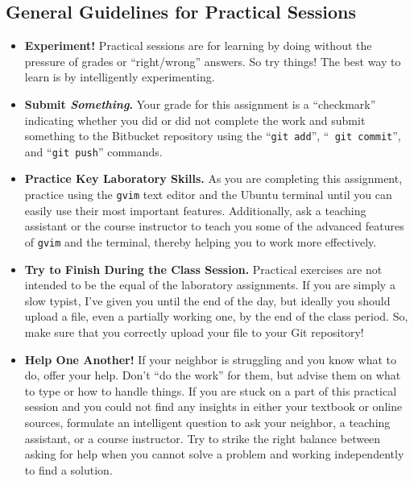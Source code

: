\vspace*{-.2in}
\subsection*{General Guidelines for Practical Sessions}


\vspace*{-.05in}
\begin{itemize}

\itemsep 0in

\item {\bf Experiment!} Practical sessions are for learning by doing without the pressure of grades or ``right/wrong''
  answers. So try things!  The best way to learn is by intelligently experimenting.

\item {\bf Submit \textbf{\textit{Something}}.} Your grade for this assignment is a ``checkmark'' indicating whether you
  did or did not complete the work and submit something to the Bitbucket repository using the ``{\tt git add}'', ``{\tt
    git commit}'', and ``{\tt git push}'' commands.

\item {\bf Practice Key Laboratory Skills.} As you are completing this assignment, practice using the {\tt gvim} text
  editor and the Ubuntu terminal until you can easily use their most important features.  Additionally, ask
  a teaching assistant or the course instructor to teach you some of the advanced features of {\tt gvim} and the
  terminal, thereby helping you to work more effectively.

\item {\bf Try to Finish During the Class Session.} Practical exercises are not intended to be the equal of the
  laboratory assignments. If you are simply a slow typist, I've given you until the end of the day, but ideally you
  should upload a file, even a partially working one, by the end of the class period. So, make sure that you correctly
  upload your file to your Git repository!


\item {\bf Help One Another!} If your neighbor is struggling and you know what to do, offer your help. Don't ``do the
  work'' for them, but advise them on what to type or how to handle things. If you are stuck on a part of this practical
  session and you could not find any insights in either your textbook or online sources, formulate an intelligent
  question to ask your neighbor, a teaching assistant, or a course instructor. Try to strike the right balance between
  asking for help when you cannot solve a problem and working independently to find a solution.


\end{itemize}
